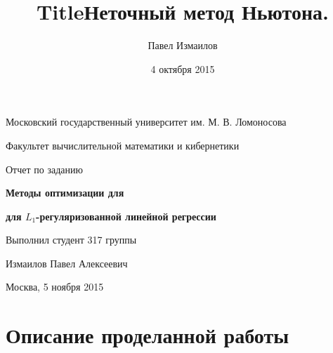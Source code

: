 \documentclass[12pt]{article}
\title{Title}
\title{Неточный метод Ньютона.}
\date{4 октября 2015}
\author{Павел Измаилов}
\begin{document}
\renewcommand{\contentsname}{\centerline{\bf Содержание}} %

\newcommand{\norm}[1]{||#1||}
\newcommand{\R}{\mathbb{R}}
\newcommand{\scalarprod}[2]{\langle #1, #2 \rangle}
\newcommand{\sgn}{\mbox{sgn}}
\newcommand{\diag}{\mbox{diag}}

\renewcommand{\refname}{\centerline{\bf Список литературы}}

\newlength{\arrayrulewidthOriginal}
\newcommand{\Cline}[2]{%
  \noalign{\global\setlength{\arrayrulewidthOriginal}{\arrayrulewidth}}%
  \noalign{\global\setlength{\arrayrulewidth}{#1}}\cline{#2}%
  \noalign{\global\setlength{\arrayrulewidth}{\arrayrulewidthOriginal}}}


\def\vec#1{\mathchoice{\mbox{\boldmath$\displaystyle#1$}}
{\mbox{\boldmath$\textstyle#1$}} {\mbox{\boldmath$\scriptstyle#1$}} {\mbox{\boldmath$\scriptscriptstyle#1$}}}

\centerline{Московский государственный университет им. М. В. Ломоносова}

\centerline{Факультет вычислительной математики и кибернетики}

\vspace{5 cm}

\centerline{\Large Отчет по заданию}

\vspace{1 cm}

\centerline{\Large \bf Методы оптимизации для}
\centerline{\Large \bf для $L_1$-регуляризованной линейной регрессии}

\vspace{6 cm}

\begin{flushright} 
Выполнил студент 317 группы

Измаилов Павел Алексеевич
\end{flushright}

\vfill 

\centerline{Москва,  5 ноября 2015}
\thispagestyle{empty} 
\pagebreak

\tableofcontents
\pagebreak

\section{Описание проделанной работы}
\end{document}
